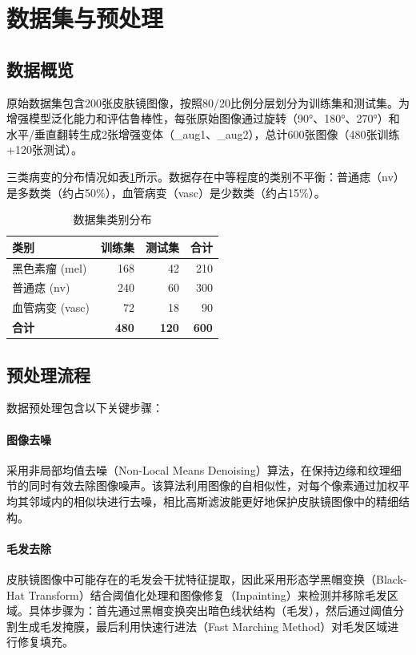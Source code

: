 \documentclass[UTF8,a4paper,12pt]{ctexart}
\numberwithin{figure}{section}
\numberwithin{table}{section}
\begin{document}
\section{数据集与预处理}\label{sec:data}

\subsection{数据概览}

原始数据集包含200张皮肤镜图像，按照80/20比例分层划分为训练集和测试集。为增强模型泛化能力和评估鲁棒性，每张原始图像通过旋转（90°、180°、270°）和水平/垂直翻转生成2张增强变体（\_aug1、\_aug2），总计600张图像（480张训练+120张测试）。

三类病变的分布情况如表\ref{tab:data_dist}所示。数据存在中等程度的类别不平衡：普通痣（nv）是多数类（约占50\%），血管病变（vasc）是少数类（约占15\%）。

\begin{table}[H]
\centering
\caption{数据集类别分布}
\label{tab:data_dist}
\begin{tabular}{lrrr}
\toprule
\textbf{类别} & \textbf{训练集} & \textbf{测试集} & \textbf{合计} \\
\midrule
黑色素瘤 (mel) & 168 & 42 & 210 \\
普通痣 (nv)    & 240 & 60 & 300 \\
血管病变 (vasc) & 72  & 18 & 90  \\
\midrule
\textbf{合计}  & \textbf{480} & \textbf{120} & \textbf{600} \\
\bottomrule
\end{tabular}
\end{table}

\subsection{预处理流程}

数据预处理包含以下关键步骤：

\paragraph{图像去噪} 采用非局部均值去噪（Non-Local Means Denoising）算法，在保持边缘和纹理细节的同时有效去除图像噪声。该算法利用图像的自相似性，对每个像素通过加权平均其邻域内的相似块进行去噪，相比高斯滤波能更好地保护皮肤镜图像中的精细结构。

\paragraph{毛发去除} 皮肤镜图像中可能存在的毛发会干扰特征提取，因此采用形态学黑帽变换（Black-Hat Transform）结合阈值化处理和图像修复（Inpainting）来检测并移除毛发区域。具体步骤为：首先通过黑帽变换突出暗色线状结构（毛发），然后通过阈值分割生成毛发掩膜，最后利用快速行进法（Fast Marching Method）对毛发区域进行修复填充。
\end{document}
